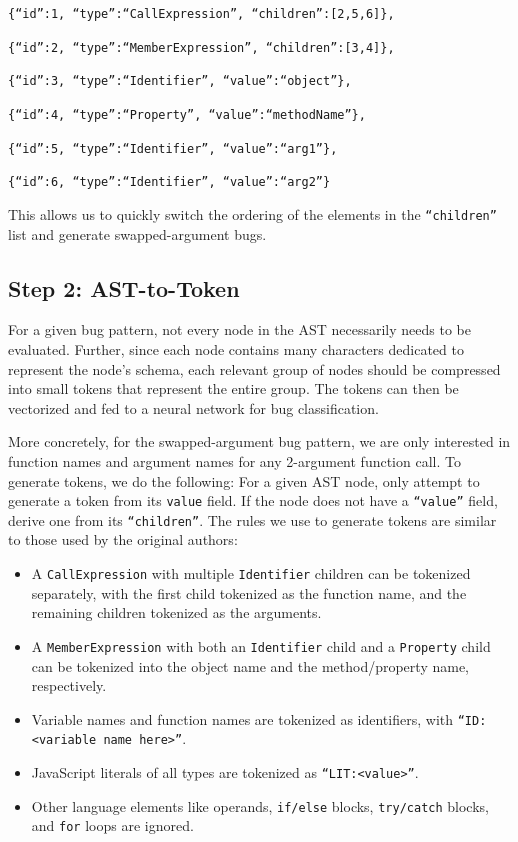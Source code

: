 \small
\texttt{\{``id'':1, ``type'':``CallExpression'', ``children'':[2,5,6]\},}

\texttt{\{``id'':2, ``type'':``MemberExpression'', ``children'':[3,4]\},}

\texttt{\{``id'':3, ``type'':``Identifier'', ``value'':``object''\},}

\texttt{\{``id'':4, ``type'':``Property'', ``value'':``methodName''\},}

\texttt{\{``id'':5, ``type'':``Identifier'', ``value'':``arg1''\},}

\texttt{\{``id'':6, ``type'':``Identifier'', ``value'':``arg2''\}}\\

\normalsize

This allows us to quickly switch the ordering of the elements in the \texttt{``children''} list and generate swapped-argument bugs.

\subsection{Step 2: AST-to-Token}
\label{subsec:step-2}
For a given bug pattern, not every node in the AST necessarily needs to be evaluated. Further, since each node contains many characters dedicated to represent the node's schema, each relevant group of nodes should be compressed into small tokens that represent the entire group. The tokens can then be vectorized and fed to a neural network for bug classification.

More concretely, for the swapped-argument bug pattern, we are only interested in function names and argument names for any 2-argument function call. To generate tokens, we do the following: For a given AST node, only attempt to generate a token from its \texttt{value} field. If the node does not have a \texttt{``value''} field, derive one from its \texttt{``children''}. The rules we use to generate tokens are similar to those used by the original authors:

\begin{itemize}
    \item A \texttt{CallExpression} with multiple \texttt{Identifier} children can be tokenized separately, with the first child tokenized as the function name, and the remaining children tokenized as the arguments.
    \item A \texttt{MemberExpression} with both an \texttt{Identifier} child and a \texttt{Property} child can be tokenized into the object name and the method/property name, respectively.
    \item Variable names and function names are tokenized as identifiers, with \texttt{``ID:<variable name here>''}.
    \item JavaScript literals of all types are tokenized as 
    \texttt{``LIT:<value>''}.
    \item Other language elements like operands, \texttt{if/else} blocks, \texttt{try/catch} blocks, and \texttt{for} loops are ignored.
\end{itemize}

